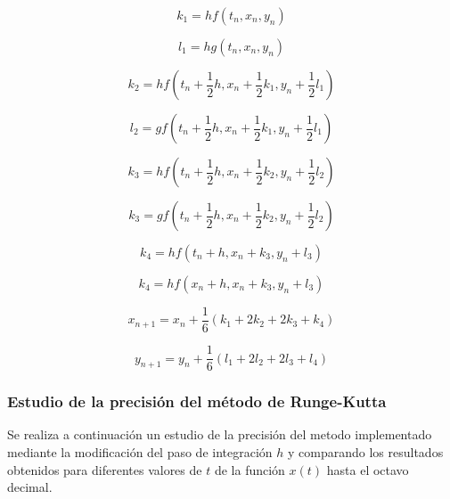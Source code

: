 \documentclass[11pt]{article}
\begin{document}
\begin{equation}
	k_1 = hf(t_n, x_n, y_n)
\end{equation}

\begin{equation}
	l_1 = hg(t_n, x_n, y_n)
\end{equation}

\begin{equation}
	k_2 = hf(t_n + \frac{1}{2}h, x_n + \frac{1}{2}k_1, y_n + \frac{1}{2}l_1)
\end{equation}

\begin{equation}
	l_2 = gf(t_n + \frac{1}{2}h, x_n + \frac{1}{2}k_1, y_n + \frac{1}{2}l_1)
\end{equation}

\begin{equation}
	k_3 = hf(t_n + \frac{1}{2}h, x_n + \frac{1}{2}k_2, y_n + \frac{1}{2}l_2)
\end{equation}

\begin{equation}
	k_3 = gf(t_n + \frac{1}{2}h, x_n + \frac{1}{2}k_2, y_n + \frac{1}{2}l_2)
\end{equation}

\begin{equation}
	k_4 = hf(t_n + h, x_n + k_3, y_n + l_3)
\end{equation}

\begin{equation}
	k_4 = hf(x_n + h, x_n + k_3, y_n + l_3)
\end{equation} 

\begin{equation}
	x_{n+1} = x_n + \frac{1}{6}(k_1 + 2k_2 + 2k_3 + k_4)
\end{equation}

\begin{equation}
	y_{n+1} = y_n + \frac{1}{6}(l_1 + 2l_2 + 2l_3 + l_4)
\end{equation}

\subsubsection{Estudio de la precisión del método de Runge-Kutta}
\label{precision-runge-kutta}
Se realiza a continuación un estudio de la precisión del metodo implementado
mediante la modificación del paso de integración $h$ y comparando los resultados
obtenidos para diferentes valores de $t$ de la función $x(t)$ hasta el octavo
decimal. 
\end{document}
